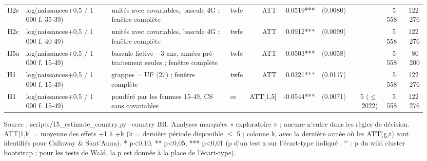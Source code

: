 \begin{table}
\begin{threeparttable}
\begin{tabular}{lp{5.2cm}p{7.4cm}lrrrrrr}
H2c & log(naissances+0,5 / 1 000 f. 35-39) & unités avec covariables, bascule 4G ; fenêtre complète & twfe & ATT & 0.0519*** & (0.0080) &  & 5\,558 & 122\,276 \\
H2c & log(naissances+0,5 / 1 000 f. 40-49) & unités avec covariables, bascule 4G ; fenêtre complète & twfe & ATT & 0.0912*** & (0.0099) &  & 5\,558 & 122\,276 \\
H5a & log(naissances+0,5 / 1 000 f. 15-49) & bascule fictive $-$3 ans, années pré-traitement seules ; fenêtre complète & twfe & ATT & 0.0503*** & (0.0058) &  & 5\,558 & 80\,200 \\
H1 & log(naissances+0,5 / 1 000 f. 15-49) & grappes = UF (27) ; fenêtre complète & twfe & ATT & 0.0321*** & (0.0117) &  & 5\,558 & 122\,276 \\
H1 & log(naissances+0,5 / 1 000 f. 15-49) & pondéré par les femmes 15-49, CS sans covariables & cs & ATT[1,5] & -0.0544*** & (0.0071) & 5 ($\leq$ 2022) & 5\,558 & 122\,276 \\
\bottomrule
\end{tabular}
\begin{tablenotes}\footnotesize
\item Source : scripts/15\_estimate\_country.py --country BR. Analyses marquées « exploratoire » ; aucune n'entre dans les règles de décision. ATT[1,k] = moyenne des effets +1 à +k (k = dernière période disponible $\leq$ 5 ; colonne k, avec la dernière année où les ATT(g,t) sont identifiés pour Callaway \& Sant'Anna). * p<0,10, ** p<0,05, *** p<0,01 (p d'un test z sur l'écart-type indiqué ; $^{w}$ : p du wild cluster bootstrap ; pour les tests de Wald, la p est donnée à la place de l'écart-type).
\end{tablenotes}
\end{threeparttable}
\end{table}
